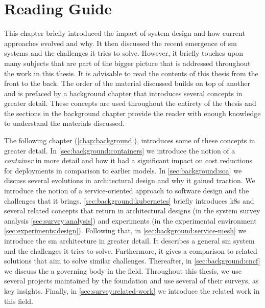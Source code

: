 \section{Reading Guide}
\label{sec:introduction:reading-guide}


This chapter briefly introduced the impact of system design and how current approaches evolved and why. It then discussed the recent emergence of \gls{sm} systems and the challenges it tries to solve. However, it briefly touches upon many subjects that are part of the bigger picture that is addressed throughout the work in this thesis. It is advisable to read the contents of this thesis from the front to the back. The order of the material discussed builds on top of another and is prefaced by a background chapter that introduces several concepts in greater detail. These concepts are used throughout the entirety of the thesis and the sections in the background chapter provide the reader with enough knowledge to understand the materials discussed.

The following chapter (\cref{chap:background}), introduces some of these concepts in greater detail. In \cref{sec:background:containers} we introduce the notion of a \textit{container} in more detail and how it had a significant impact on cost reductions for deployments in comparison to earlier models. In \cref{sec:background:soa} we discuss several evolutions in architectural design and why it gained traction. We introduce the notion of a service-oriented approach to software design and the challenges that it brings. \cref{sec:background:kubernetes} briefly introduces \gls{k8s} and several related concepts that return in architectural designs (in the system survey analysis \cref{sec:survey:analysis}) and experiments (in the experimental environment \cref{sec:experiments:design}). Following that, in \cref{sec:background:service-mesh} we introduce the \gls{sm} architecture in greater detail. It describes a general \gls{sm} system and the challenges it tries to solve. Furthermore, it gives a comparison to related solutions that aim to solve similar challenges. Thereafter, in \cref{sec:background:cncf} we discuss the  a governing body in the field. Throughout this thesis, we use several projects maintained by the foundation and use several of their surveys, as key insights. Finally, in \cref{sec:survey:related-work} we introduce the related work in this field.